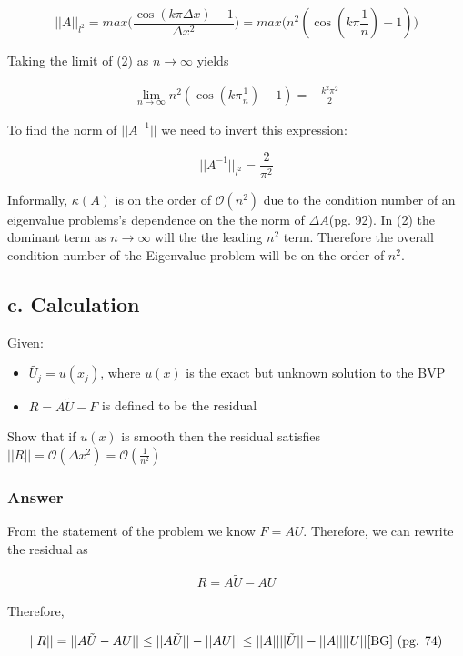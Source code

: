 \documentclass{article}
\begin{document}
	\begin{equation}
		||A||_{l^{2}}=max\Big(\frac{\cos(k\pi\Delta x)-1}{\Delta x^{2}}\Big)=max\Big(n^{2}(\cos(k\pi\frac{1}{n})-1)\Big)
	\end{equation}

	Taking the limit of (2) as $n\rightarrow\infty$ yields
	
	\begin{align*}
		\lim_{n\rightarrow\infty}n^{2}(\cos(k\pi\frac{1}{n})-1)=-\frac{k^2\pi^2}{2}
	\end{align*}
	
	To find the norm of $||A^{-1}||$ we need to invert this expression:
	
	\begin{equation}
		||A^{-1}||_{l^{2}}=\frac{2}{\pi^{2}}
	\end{equation}
	
	Informally, $\kappa(A)$ is on the order of $\mathcal{O}(n^{2})$ due to the condition number of an eigenvalue problems's dependence on the the norm of $\Delta A$\cite{BG}(pg. 92).  In (2) the dominant term as $n\rightarrow\infty$ will the the leading $n^{2}$ term.  Therefore the overall condition number of the Eigenvalue problem will be on the order of $n^{2}$.
	
	\subsection{c. Calculation}
		Given:
		\begin{itemize}
			\item $\tilde{U_{j}}=u(x_j)$, where $u(x)$ is the exact but unknown solution to the BVP
			\item $R=A\tilde{U}-F$ is defined to be the residual
		\end{itemize}
		Show that if $u(x)$ is smooth then the residual satisfies $||R||=\mathcal{O}(\Delta x^{2})=\mathcal{O}(\frac{1}{n^{2}})$
	\subsubsection{Answer}
		From the statement of the problem we know $F=AU$.  Therefore, we can rewrite the residual as 
		
		\begin{align*}
			R=A\tilde{U}-AU
		\end{align*}
		
		Therefore,
		
		\begin{align*}
			||R||=||A\tilde{U}-AU||\leq||A\tilde{U}||-||AU||\leq||A|| ||\tilde{U}||-||A|| ||U|| \text{\cite{BG} (pg. 74)}
		\end{align*}
		
\end{document}
